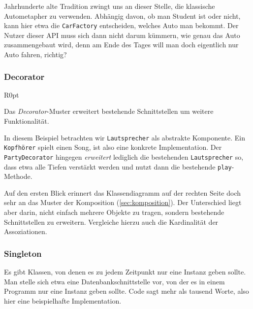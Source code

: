 \documentclass[a4paper,parskip=half*,DIV=7,fontsize=11pt]{scrartcl}
\begin{document}
Jahrhunderte alte Tradition zwingt uns an dieser Stelle, die klassische Autometapher zu verwenden. Abhängig davon, ob man Student ist oder nicht, kann hier etwa die \lstinline{CarFactory} entscheiden, welches Auto man bekommt. Der Nutzer dieser API muss sich dann nicht darum kümmern, wie genau das Auto zusammengebaut wird, denn am Ende des Tages will man doch eigentlich nur Auto fahren, richtig?

\subsubsection{Decorator}

\begin{wrapfigure}[11]{R}{0pt} 
\end{wrapfigure}

Das \emph{Decorator}-Muster erweitert bestehende Schnittstellen um weitere Funktionalität.

In diesem Beispiel betrachten wir \lstinline{Lautsprecher} als abstrakte Komponente. Ein \lstinline{Kopfhörer} spielt einen Song, ist also eine konkrete Implementation. Der \lstinline{PartyDecorator} hingegen \emph{erweitert} lediglich die bestehenden \lstinline{Lautsprecher} so, dass etwa alle Tiefen verstärkt werden und nutzt dann die bestehende \lstinline{play}-Methode.

Auf den ersten Blick erinnert das Klassendiagramm auf der rechten Seite doch sehr an das Muster der Komposition (\ref{sec:komposition}). Der Unterschied liegt aber darin, nicht einfach mehrere Objekte zu tragen, sondern bestehende Schnittstellen zu erweitern. Vergleiche hierzu auch die Kardinalität der Assoziationen.

\subsubsection{Singleton}

Es gibt Klassen, von denen es zu jedem Zeitpunkt nur eine Instanz geben sollte. Man stelle sich etwa eine Datenbankschnittstelle vor, von der es in einem Programm nur eine Instanz geben sollte. Code sagt mehr als tausend Worte, also hier eine beispielhafte Implementation.
\end{document}
